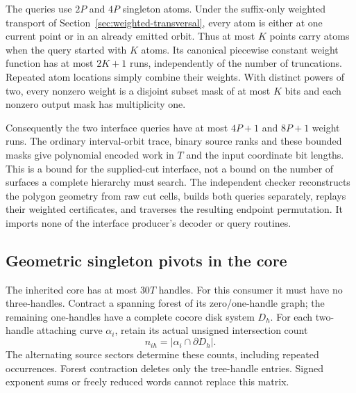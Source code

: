 The queries use $2P$ and $4P$ singleton atoms. Under the suffix-only weighted
transport of Section~\ref{sec:weighted-transversal}, every atom is either at
one current point or in an already emitted orbit. Thus at most $K$ points
carry atoms when the query started with $K$ atoms. Its canonical piecewise
constant weight function has at most $2K+1$ runs, independently of the
number of truncations. Repeated atom locations simply combine their weights.
With distinct powers of two, every nonzero weight is a disjoint subset mask
of at most $K$ bits and each nonzero output mask has multiplicity one.

Consequently the two interface queries have at most $4P+1$ and $8P+1$
weight runs. The ordinary interval-orbit trace, binary source ranks and
these bounded masks give polynomial encoded work in $T$ and the input
coordinate bit lengths. This is a bound for the supplied-cut interface,
not a bound on the number of surfaces a complete hierarchy must search.
The independent checker reconstructs the polygon geometry from raw cut
cells, builds both queries separately, replays their weighted certificates,
and traverses the resulting endpoint permutation. It imports none of the
interface producer's decoder or query routines.

\subsection{Geometric singleton pivots in the core}

The inherited core has at most $30T$ handles. For this consumer it must have
no three-handles. Contract a spanning forest of its zero/one-handle graph;
the remaining one-handles have a complete cocore disk system $D_h$.
For each two-handle attaching curve $\alpha_i$, retain its actual unsigned
intersection count
\[
 n_{ih}=|\alpha_i\cap\partial D_h|.
\]
The alternating source sectors determine these counts, including repeated
occurrences. Forest contraction deletes only the tree-handle entries.
Signed exponent sums or freely reduced words cannot replace this matrix.

